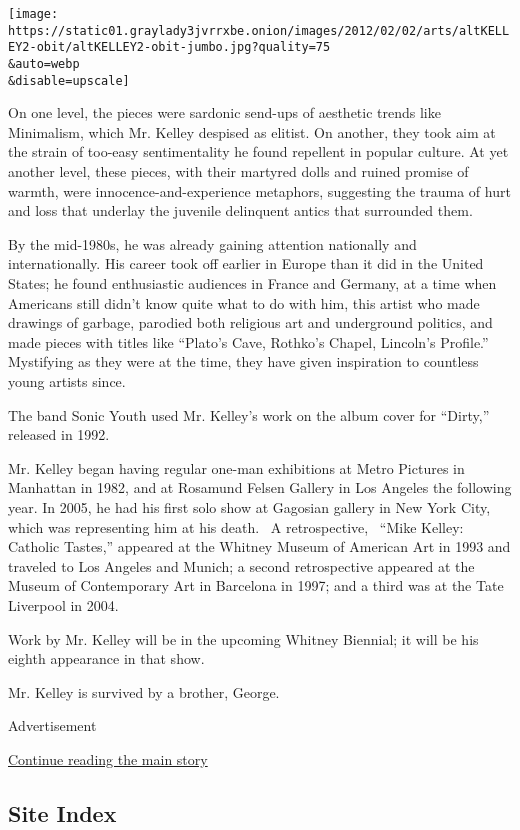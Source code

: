 \texttt{[image: https://static01.graylady3jvrrxbe.onion/images/2012/02/02/arts/altKELLEY2-obit/altKELLEY2-obit-jumbo.jpg?quality=75\\\&auto=webp\\\&disable=upscale]}

On one level, the pieces were sardonic send-ups of aesthetic trends like
Minimalism, which Mr. Kelley despised as elitist. On another, they took
aim at the strain of too-easy sentimentality he found repellent in
popular culture. At yet another level, these pieces, with their martyred
dolls and ruined promise of warmth, were innocence-and-experience
metaphors, suggesting the trauma of hurt and loss that underlay the
juvenile delinquent antics that surrounded them.

By the mid-1980s, he was already gaining attention nationally and
internationally. His career took off earlier in Europe than it did in
the United States; he found enthusiastic audiences in France and
Germany, at a time when Americans still didn't know quite what to do
with him, this artist who made drawings of garbage, parodied both
religious art and underground politics, and made pieces with titles like
``Plato's Cave, Rothko's Chapel, Lincoln's Profile.'' Mystifying as they
were at the time, they have given inspiration to countless young artists
since.

The band Sonic Youth used Mr. Kelley's work on the album cover for
``Dirty,'' released in 1992.

Mr. Kelley began having regular one-man exhibitions at Metro Pictures in
Manhattan in 1982, and at Rosamund Felsen Gallery in Los Angeles the
following year. In 2005, he had his first solo show at Gagosian gallery
in New York City, which was representing him at his death. ~A
retrospective, ~``Mike Kelley: Catholic Tastes,'' appeared at the
Whitney Museum of American Art in 1993 and traveled to Los Angeles and
Munich; a second retrospective appeared at the Museum of Contemporary
Art in Barcelona in 1997; and a third was at the Tate Liverpool in 2004.

Work by Mr. Kelley will be in the upcoming Whitney Biennial; it will be
his eighth appearance in that show.

Mr. Kelley is survived by a brother, George.

Advertisement

\protect\hyperlink{after-bottom}{Continue reading the main story}

\hypertarget{site-index}{%
\subsection{Site Index}\label{site-index}}

